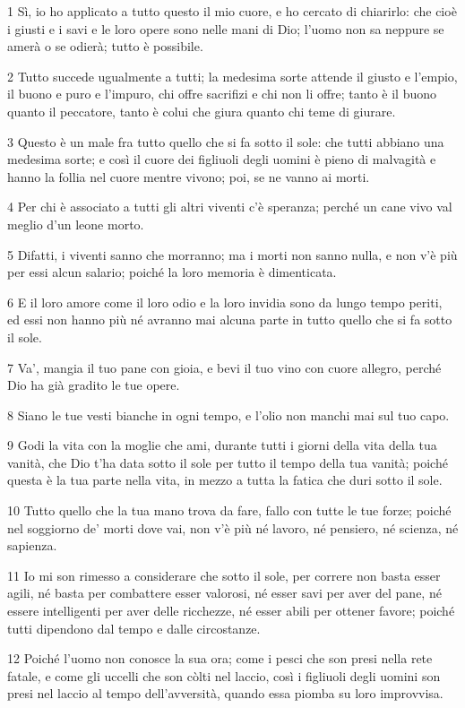 \par 1 Sì, io ho applicato a tutto questo il mio cuore, e ho cercato di chiarirlo: che cioè i giusti e i savi e le loro opere sono nelle mani di Dio; l'uomo non sa neppure se amerà o se odierà; tutto è possibile.
\par 2 Tutto succede ugualmente a tutti; la medesima sorte attende il giusto e l'empio, il buono e puro e l'impuro, chi offre sacrifizi e chi non li offre; tanto è il buono quanto il peccatore, tanto è colui che giura quanto chi teme di giurare.
\par 3 Questo è un male fra tutto quello che si fa sotto il sole: che tutti abbiano una medesima sorte; e così il cuore dei figliuoli degli uomini è pieno di malvagità e hanno la follia nel cuore mentre vivono; poi, se ne vanno ai morti.
\par 4 Per chi è associato a tutti gli altri viventi c'è speranza; perché un cane vivo val meglio d'un leone morto.
\par 5 Difatti, i viventi sanno che morranno; ma i morti non sanno nulla, e non v'è più per essi alcun salario; poiché la loro memoria è dimenticata.
\par 6 E il loro amore come il loro odio e la loro invidia sono da lungo tempo periti, ed essi non hanno più né avranno mai alcuna parte in tutto quello che si fa sotto il sole.
\par 7 Va', mangia il tuo pane con gioia, e bevi il tuo vino con cuore allegro, perché Dio ha già gradito le tue opere.
\par 8 Siano le tue vesti bianche in ogni tempo, e l'olio non manchi mai sul tuo capo.
\par 9 Godi la vita con la moglie che ami, durante tutti i giorni della vita della tua vanità, che Dio t'ha data sotto il sole per tutto il tempo della tua vanità; poiché questa è la tua parte nella vita, in mezzo a tutta la fatica che duri sotto il sole.
\par 10 Tutto quello che la tua mano trova da fare, fallo con tutte le tue forze; poiché nel soggiorno de' morti dove vai, non v'è più né lavoro, né pensiero, né scienza, né sapienza.
\par 11 Io mi son rimesso a considerare che sotto il sole, per correre non basta esser agili, né basta per combattere esser valorosi, né esser savi per aver del pane, né essere intelligenti per aver delle ricchezze, né esser abili per ottener favore; poiché tutti dipendono dal tempo e dalle circostanze.
\par 12 Poiché l'uomo non conosce la sua ora; come i pesci che son presi nella rete fatale, e come gli uccelli che son còlti nel laccio, così i figliuoli degli uomini son presi nel laccio al tempo dell'avversità, quando essa piomba su loro improvvisa.
